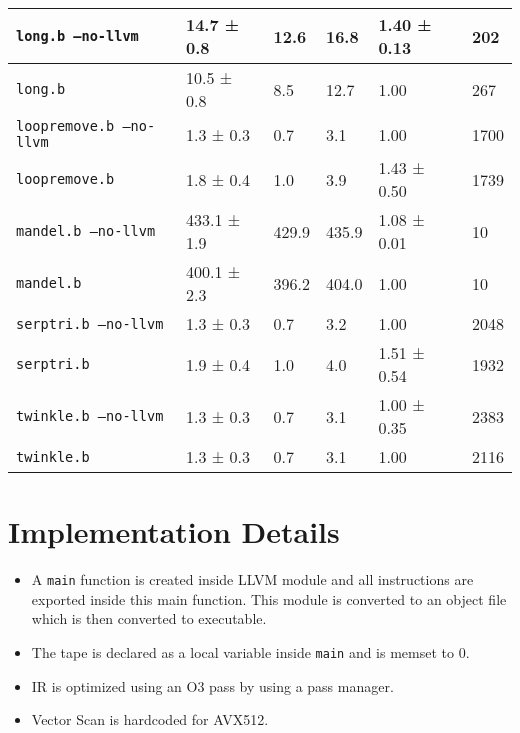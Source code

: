 \documentclass[11pt,answers]{exam}
\begin{document}
\begin{table}[H]
\begin{tabular}{|l|l|l|l|l|l|}
    \texttt{long.b --no-llvm}         & 14.7 ± 0.8         & 12.6              & 16.8              & 1.40 ± 0.13       & 202\\ \hline
    \texttt{long.b}                   & 10.5 ± 0.8         & 8.5               & 12.7              & 1.00              & 267\\ \hline\hline
    \texttt{loopremove.b --no-llvm}   & 1.3 ± 0.3          & 0.7               & 3.1               & 1.00              & 1700\\ \hline
    \texttt{loopremove.b}             & 1.8 ± 0.4          & 1.0               & 3.9               & 1.43 ± 0.50       & 1739\\ \hline\hline
    \texttt{mandel.b --no-llvm}       & 433.1 ± 1.9        & 429.9             & 435.9             & 1.08 ± 0.01       & 10\\ \hline
    \texttt{mandel.b}                 & 400.1 ± 2.3        & 396.2             & 404.0             & 1.00              & 10\\ \hline\hline
    \texttt{serptri.b --no-llvm}      & 1.3 ± 0.3          & 0.7               & 3.2               & 1.00              & 2048\\ \hline
    \texttt{serptri.b}                & 1.9 ± 0.4          & 1.0               & 4.0               & 1.51 ± 0.54       & 1932\\ \hline\hline
    \texttt{twinkle.b --no-llvm}      & 1.3 ± 0.3          & 0.7               & 3.1               & 1.00 ± 0.35       & 2383\\ \hline
    \texttt{twinkle.b}                & 1.3 ± 0.3          & 0.7               & 3.1               & 1.00              & 2116\\ \hline
  \end{tabular}
\end{table}

\pagebreak
\section{Implementation Details}
\begin{itemize}
  \item A \texttt{main} function is created inside LLVM module and all instructions are exported inside this main function. This module is converted to an object file which is then converted to executable.
  \item The tape is declared as a local variable inside \texttt{main} and is memset to 0.
  \item IR is optimized using an O3 pass by using a pass manager.
  \item Vector Scan is hardcoded for AVX512.
\end{itemize}
\end{document}
